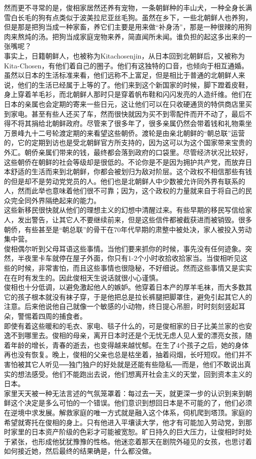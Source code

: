 然而更不寻常的是，俊相家居然还养有宠物，一条朝鲜种的丰山犬，一种全身长满雪白长毛的狗有点类似于波美拉尼亚丝毛狗。虽然在乡下，一些北朝鲜人也养狗，但是那是把狗当成一种家畜，养它们主要是用来做“补身汤”，那是一种很辣的用狗肉来熬炖的汤。把狗当成家庭宠物来养，简直闻所未闻。谁负担的起这多出来的一张嘴呢？\\

事实上，日籍朝鲜人，也被称为Kitachosenjin，从日本回到北朝鲜后，又被称为Kita-Chosen，有他们着自己的圈子。他们有这独特的口音，也倾向于相互通婚。虽然以日本的生活标准来看，他们远称不上富足，但是相比于普通的北朝鲜人来说，他们的生活已经属于上等的了。他们来到这个新国家的时候，脚下蹬着皮鞋，身上穿着羊毛衫，而北朝鲜人那时只是穿着帆布鞋和闪闪发亮的人造纤维。他们在日本的亲属也会定期的寄来一些日元，这让他们可以在只收硬通货的特供商店里买到家电。甚至有些人还买了车，然而很快就因为买不到零配件而开不动了，最后不得不将其捐给北朝鲜政府。尽管来了很多年了，很多亲属仍然会带着钱和礼物乘坐万景峰九十二号轮渡定期的来看望这些朝侨。渡轮是由亲北朝鲜的“朝总联”运营的，它的定期到访也是受北朝鲜官方所支持的，因为这可以为这个国家带来宝贵的外汇。朝侨亲属们带来的钱，最终都会落到政府的口袋里。尽管经济状况比较好，这些朝侨在朝鲜的社会等级却是很低的。不论你是不是因为拥护共产党，而放弃日本舒适的生活而来到北朝鲜，你都会被划归为敌对阶层。这个政权不相信那些有钱的但是却不是劳动党党员的人。他们也是北朝鲜人中少数被允许同外界有联系的人，然而此举也意味着他们很不可靠；因为，这个政权的力量就来自于将自己的民众完全同外界隔绝起来的能力。\\

这些新移民很快就从他们的理想主义的幻想中清醒过来。有些早期的移民写信给家人，发出警告，让其它人不要继续前来，但是这些信件都被截获进而被销毁。很多朝侨，有些甚至是“朝总联”的骨干在70年代早期的肃整中被处决，家人被投入劳动集中营。\\

俊相偶尔听到父母耳语这些事情。当他们要来抓你的时候，事先没有任何迹象。突然，半夜里卡车就停在屋子外面，你只有1-2个小时收拾收拾家当。当俊相听见这些的时候，非常害怕，而且这些事情也很隐秘，不好细说。然而这些事情又是实实在在时有发生的。因此俊相天生说话就很小心谨慎。\\

俊相也十分低调，以避免激起他人的嫉妒。他穿着日本产的厚羊毛袜，而大多数其它的孩子根本就没有袜子穿，于是他把总是拉长裤腿把脚罩住，避免引起其它人的注意。后来他说他自己就像一个敏感的小动物，终日提心吊胆，时时刻刻竖起耳朵，警惕着四周的捕食者。\\

即使有着这些暖和的毛衣、家电、毯子什么的，可是俊相家的日子比美兰家的也安逸不到哪里去。俊相的母亲，离开日本时还是个无忧无虑人见人爱的漂亮女孩，随着年龄的增长，青春的逝去，也变得越来越忧郁。在生了4个孩子之后，她的身体再也没有恢复。晚上，俊相的父亲也总是枯坐着，抽着闷烟，长吁短叹。他们并不害怕被其它人听见──独门独户的好处就是还能有些隐私──而是，他们不敢说出真实的想法感受。他们不能跑出去说，他们想离开社会主义的天堂，回到资本主义的日本。\\

家里天天被一种无法言述的气氛笼罩着：每过去一天，就更深一步的认识到来到朝鲜这个决定是多么可怕的一个错误。他们意识到想回日本是不可能的了，他们必须在逆境中求发展。解救家庭的唯一方式就是融入这个体系，伺机爬到塔顶。家庭的希望就寄托在俊相的身上。只有他进入平壤读大学，他才有可能加入劳动党，到那时家里的日本资产阶级的色彩才可能被宽恕。旷日持久的巨大压力，让俊相时时处于紧张，也形成他犹犹豫豫的性格。他迷恋着那天在剧院外碰见的女孩，也思讨着如何接近她，然后最终的结果确是，什么都没做。\\
